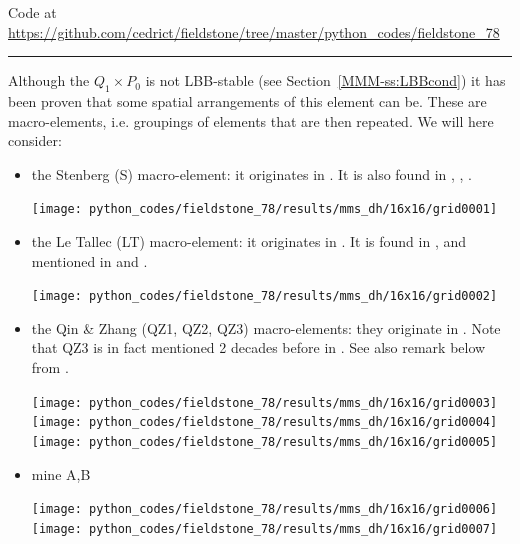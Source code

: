 %

\begin{center}
Code at \url{https://github.com/cedrict/fieldstone/tree/master/python_codes/fieldstone_78}
\end{center}

\par\noindent\rule{\textwidth}{0.4pt}



Although the $Q_1\times P_0$ is not LBB-stable (see Section~\ref{MMM-ss:LBBcond})
it has been proven that some spatial arrangements of this element can be.
These are macro-elements, i.e. groupings of elements that are then repeated.
We will here consider:

\begin{itemize}
\item the Stenberg (S) macro-element: it originates in \cite{sten84}.
It is also found in \cite{chba93}, \cite{brfo}, \cite{qizh07}.

\begin{center}
\texttt{[image: python\_codes/fieldstone\_78/results/mms\_dh/16x16/grid0001]}
\end{center}

\item the Le Tallec (LT) macro-element: it originates in \cite{leta81}. 
It is found in \cite{leru86}, \cite{qizh07}  and mentioned in \cite{brfo} and \cite{rovira1992}.
\begin{center}
\texttt{[image: python\_codes/fieldstone\_78/results/mms\_dh/16x16/grid0002]}
\end{center}

\item the Qin \& Zhang (QZ1, QZ2, QZ3) macro-elements: they originate in \cite{qizh07}.
Note that QZ3 is in fact mentioned 2 decades before in \cite{idsn95}. See also 
remark below from \cite{rovira1992}. 
\begin{center}
\texttt{[image: python\_codes/fieldstone\_78/results/mms\_dh/16x16/grid0003]}
\texttt{[image: python\_codes/fieldstone\_78/results/mms\_dh/16x16/grid0004]}
\texttt{[image: python\_codes/fieldstone\_78/results/mms\_dh/16x16/grid0005]}
\end{center}

\item mine A,B

\begin{center}
\texttt{[image: python\_codes/fieldstone\_78/results/mms\_dh/16x16/grid0006]}
\texttt{[image: python\_codes/fieldstone\_78/results/mms\_dh/16x16/grid0007]}
\end{center}

\end{itemize}




